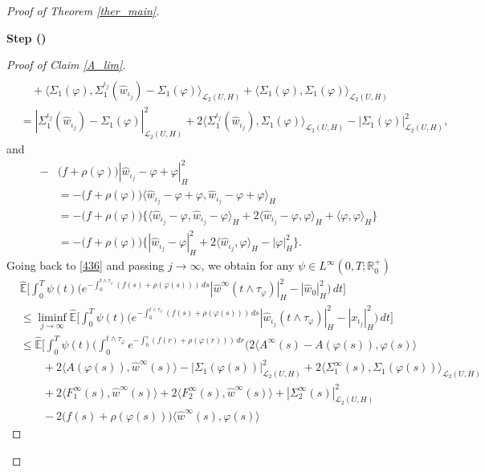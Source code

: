 \documentclass[english,a4paper,11pt]{amsart}
\theoremstyle{plain}
\theoremstyle{definition}
\theoremstyle{remark}
\numberwithin{equation}{section}
\newcounter{lil1}
\newenvironment{step}
{\begin{list} { \bf Step (\Roman{lil1})}
		{ \usecounter{lil1}
			\setlength{\leftmargin}{0.0cm}
			\setlength{\topsep}{0.2cm}
			\setlength{\itemsep}{0.0cm}
			\setlength{\parsep}{0.1cm}
			\setlength{\itemindent}{0.8cm}
			\setlength{\parskip}{0.0cm}}}
	{\end{list}}
\newcounter{lil33}
\newcounter{lil1q}
\newcommand{\wh}{\widehat}
\newcommand{\la}{\langle}
\newcommand{\ra}{\rangle}
\newcommand{\EE}{ \mathbb{E} }
\newcommand{\R}{\mathbb{R}}
\begin{document}
\begin{proof}[Proof of Theorem \ref{ther_main}]
\begin{step}
\begin{proof}[Proof of Claim \ref{A_lim}]
\begin{align*}
\\&\quad + \la \Sigma_1(\varphi), \Sigma_1^{{\iota_j}}(  {\wh{w}}_{{\iota_j}})-\Sigma_1(\varphi)\ra_{\mathcal{L}_2(U,H)} +\la \Sigma_1(\varphi), \Sigma_1(\varphi)\ra_{\mathcal{L}_2(U,H)} \\&
= | \Sigma_1^{{\iota_j}}(  {\wh{w}}_{{\iota_j}})-\Sigma_1(\varphi) | _{\mathcal{L}_2(U,H)}^2+2\la  \Sigma_1^{{\iota_j}}(  {\wh{w}}_{{\iota_j}}),\Sigma_1(\varphi)\ra_{\mathcal{L}_2(U,H)} - | \Sigma_1(\varphi) | _ {\mathcal{L}_2(U,H)}^2, 
\end{align*}and 
\begin{align*}
		-&\big(f+\rho(\varphi)\big) | \wh{w}_{\iota_j}-\varphi+\varphi | _H^2 \\&
		=	-	\big(f+\rho(\varphi)\big)\la \wh{w}_{\iota_j}-\varphi+\varphi,\wh{w}_{\iota_j}-\varphi+\varphi\ra_H
		\\&=-	\big(f+\rho(\varphi)\big) \Big\{\la \wh{w}_{\iota_j}-\varphi,\wh{w}_{\iota_j}-\varphi\ra_H+2\la \wh{w}_{\iota_j}-\varphi,\varphi\ra_H +\la\varphi,\varphi\ra_H
		 \Big\}
		 \\&=-	\big(f+\rho(\varphi)\big) \Big\{ | \wh{w}_{\iota_j}-\varphi | _H^2+2\la \wh{w}_{\iota_j},\varphi\ra_H- | \varphi | _H^2
		 \Big\}.
\end{align*}
%
Going back to \eqref{436} and passing $j\to\infty$, we obtain for any $\psi \in L^\infty(0,T;\R^+_0)$ 
\begin{align}\label{MM01}\nonumber
&	\wh{\EE}\bigg[\int_0^T \psi (t)\bigg( e^{-\int_0^{t\wedge \tau_\varphi}(f(s)+\rho(\varphi(s)))\,ds} | {\wh{w}}^\infty(t\wedge \tau_{\varphi}) | _H^2- | \wh{w}_0 | _H^2\bigg)\,dt \bigg]
	\\&\nonumber
	\leq
	\liminf_{j\to\infty}	\wh{\EE}\bigg[\int_0^T \psi (t)\bigg( e^{-\int_0^{t\wedge \tau_\varphi}(f(s)+\rho(\varphi(s)))\,ds} | \wh{w}_{\iota_j}(t\wedge \tau_{\varphi}) | _H^2- | x_{\iota_j} | _H^2\bigg)\,dt \bigg]
		\\& \nonumber\leq 
	{\wh{\EE}}
	\bigg[\int_0^T\psi(t)\bigg( \int_0^{t\wedge \tau_{\varphi}} e^{-\int_0^{s}(f(r)+\rho(\varphi(r)))\, dr}\bigg(2\la A^{\infty} (s)-A(\varphi(s)),\varphi(s)\ra \\&\nonumber\qquad +2\la A	(\varphi(s)),{\wh{w}}^\infty(s)\ra - | \Sigma_1(\varphi(s)) | _{\mathcal{L}_2(U,H)}^2
	+2\la \Sigma_1^{\infty}(s), \Sigma_1(\varphi(s))\ra_{\mathcal{L}_2(U,H)}
	\\&\nonumber\qquad +2\la  F_1^{\infty}(s),\wh{w}^\infty(s)\ra  +2\la  F_2^{\infty}(s),\wh{w}^\infty(s)\ra + | \Sigma_2^{\infty}(s) | _{\mathcal{L}_2(U,H)}^2
	\\&\qquad -2\big(f(s)+\rho(\varphi(s))\big)\la \wh{w}^\infty(s),\varphi(s)\ra

\end{align}
\end{proof}
\end{step}
\end{proof}
\end{document}
